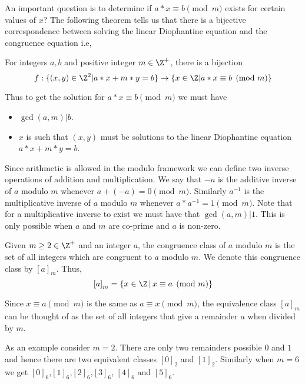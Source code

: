 An important question is to determine if $a*x \equiv b \pmod m$ exists for certain values of $x$? 
The following theorem tells us that there is a bijective correspondence between solving the 
linear Diophantine equation and the congruence equation i.e,
\begin{Theorem}
    For integers $a,b$ and positive integer $m \in \Z^{+}$, there is a bijection
    \begin{equation*}
	f: \lbrace (x,y) \in \Z^2 \lvert a*x + m*y = b \rbrace \to \lbrace x \in \Z \lvert a*x \equiv b
	\pmod m \rbrace 
    \end{equation*}
\end{Theorem}

Thus to get the solution for $a*x \equiv b \pmod m$ we must have
\begin{itemize}
    \item $\gcd(a,m) | b$. 
    \item $x$ is such that $(x,y)$ must be solutions to the linear Diophantine equation $a*x + m*y =
	b$.
\end{itemize}

Since arithmetic is allowed in the modulo framework we can define two inverse operations of addition
and multiplication. 
We say that $-a$ is the additive inverse of $a$ modulo $m$ whenever $a + (-a) = 0 \pmod m$.
Similarly $a^{-1}$ is the multiplicative inverse of $a$ modulo $m$ whenever $a*a^{-1} = 1 \pmod m$.
Note that for a multiplicative inverse to exist we must have that $\gcd(a,m) | 1$. This is only
possible when $a$ and $m$ are co-prime and $a$ is non-zero.

\begin{Definition}
    Given $m \geq 2 \in \Z^{+}$ and an integer $a$, the congruence class of $a$ modulo $m$ is the
    set of all integers which are congruent to $a$ modulo $m$. We denote this congruence class by
    ${\left[a\right]}_{m}$. Thus,
    \begin{equation*}
	{\left[a\right]}_{m} = \lbrace x \in \Z \, \lvert \, x \equiv a \pmod m \rbrace
    \end{equation*}
\end{Definition}
Since $x \equiv a \pmod m$ is the same as $a \equiv x \pmod m$, the equivalence class
${\left[a\right]}_m$ can be thought of as the set of all integers that give a remainder $a$ when
divided by $m$.

As an example consider $m = 2$. There are only two remainders possible $0$ and $1$ and hence there
are two equivalent classes ${\left[0\right]}_2$ and ${\left[1\right]}_2$. Similarly when $m = 6$ we
get ${\left[0\right]}_6$,${\left[1\right]}_6$,${\left[2\right]}_6$,${\left[3\right]}_6$,
${\left[4\right]}_6$ and ${\left[5\right]}_6$.

